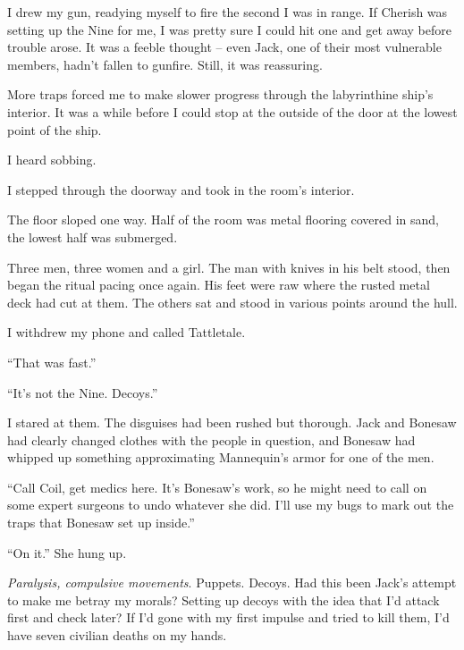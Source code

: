 I drew my gun, readying myself to fire the second I was in range.  If Cherish was setting up the Nine for me, I was pretty sure I could hit one and get away before trouble arose.  It was a feeble thought – even Jack, one of their most vulnerable members, hadn't fallen to gunfire.  Still, it was reassuring.



More traps forced me to make slower progress through the labyrinthine ship's interior.  It was a while before I could stop at the outside of the door at the lowest point of the ship.



I heard sobbing.



I stepped through the doorway and took in the room's interior.



The floor sloped one way.  Half of the room was metal flooring covered in sand, the lowest half was submerged.



Three men, three women and a girl.  The man with knives in his belt stood, then began the ritual pacing once again.  His feet were raw where the rusted metal deck had cut at them.  The others sat and stood in various points around the hull.



I withdrew my phone and called Tattletale.



``That was fast.''



``It's not the Nine.  Decoys.''



I stared at them.  The disguises had been rushed but thorough.  Jack and Bonesaw had clearly changed clothes with the people in question, and Bonesaw had whipped up something approximating Mannequin's armor for one of the men.



``Call Coil, get medics here.  It's Bonesaw's work, so he might need to call on some expert surgeons to undo whatever she did.  I'll use my bugs to mark out the traps that Bonesaw set up inside.''



``On it.''  She hung up.



\emph{Paralysis, compulsive movements}.  Puppets.  Decoys.  Had this been Jack's attempt to make me betray my morals?  Setting up decoys with the idea that I'd attack first and check later?  If I'd gone with my first impulse and tried to kill them, I'd have seven civilian deaths on my hands.



